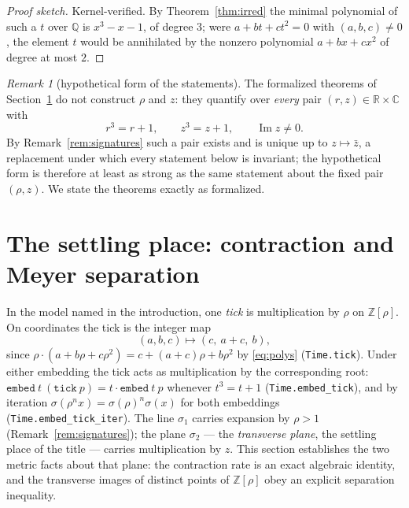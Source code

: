 \documentclass[11pt]{amsart}
\theoremstyle{plain}
\theoremstyle{definition}
\theoremstyle{remark}
\newtheorem{remark}[theorem]{Remark}
\begin{document}
\begin{proof}[Proof sketch]
Kernel-verified. By Theorem~\ref{thm:irred} the minimal polynomial of such a $t$ over $\mathbb{Q}$ is $x^3 - x - 1$, of degree $3$; were $a + bt + ct^2 = 0$ with $(a,b,c) \ne 0$, the element $t$ would be annihilated by the nonzero polynomial $a + bx + cx^2$ of degree at most $2$.
\end{proof}

\begin{remark}[hypothetical form of the statements]\label{rem:hyps}
The formalized theorems of Section~\ref{sec:settling} do not construct $\rho$ and $z$: they quantify over \emph{every} pair $(r, z) \in \mathbb{R} \times \mathbb{C}$ with
\begin{equation}\label{eq:rootpair}
  r^3 = r + 1, \qquad z^3 = z + 1, \qquad \operatorname{Im} z \ne 0 .
\end{equation}
By Remark~\ref{rem:signatures} such a pair exists and is unique up to $z \mapsto \bar z$, a replacement under which every statement below is invariant; the hypothetical form is therefore at least as strong as the same statement about the fixed pair $(\rho, z)$. We state the theorems exactly as formalized.
\end{remark}

\section{The settling place: contraction and Meyer separation}\label{sec:settling}

In the model named in the introduction, one \emph{tick} is multiplication by $\rho$ on $\mathbb{Z}[\rho]$. On coordinates the tick is the integer map
\[
  (a, b, c) \longmapsto (c,\ a + c,\ b),
\]
since $\rho \cdot (a + b\rho + c\rho^2) = c + (a+c)\rho + b\rho^2$ by \eqref{eq:polys} \textup{(\texttt{Time.tick})}. Under either embedding the tick acts as multiplication by the corresponding root: $\mathtt{embed}\ t\ (\mathtt{tick}\ p) = t \cdot \mathtt{embed}\ t\ p$ whenever $t^3 = t + 1$ \textup{(\texttt{Time.embed\_tick})}, and by iteration $\sigma(\rho^n x) = \sigma(\rho)^n \sigma(x)$ for both embeddings \textup{(\texttt{Time.embed\_tick\_iter})}. The line $\sigma_1$ carries expansion by $\rho > 1$ (Remark~\ref{rem:signatures}); the plane $\sigma_2$ --- the \emph{transverse plane}, the settling place of the title --- carries multiplication by $z$. This section establishes the two metric facts about that plane: the contraction rate is an exact algebraic identity, and the transverse images of distinct points of $\mathbb{Z}[\rho]$ obey an explicit separation inequality.
\end{document}
